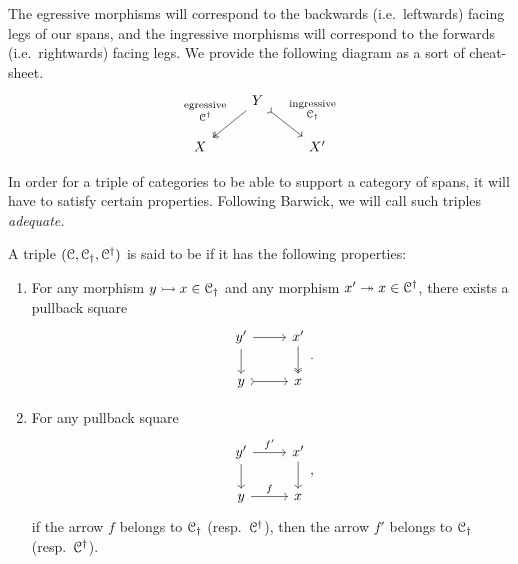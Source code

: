 \documentclass[main.tex]{subfiles}
\begin{document}
The egressive morphisms will correspond to the backwards (i.e.\ leftwards) facing legs of our spans, and the ingressive morphisms will correspond to the forwards (i.e.\ rightwards) facing legs. We provide the following diagram as a sort of cheat-sheet.
\begin{equation*}
  \begin{tikzcd}
    & Y
    \arrow[dl, two heads, swap, "\substack{\text{egressive} \\ \category{C}\updag}"]
    \arrow[dr, rightarrowtail, "\substack{\text{ingressive} \\ \category{C}\downdag}"]
    \\
    X
    && X'
  \end{tikzcd}
\end{equation*}

In order for a triple of categories to be able to support a category of spans, it will have to satisfy certain properties. Following Barwick, we will call such triples \emph{adequate.}

\begin{definition}
  \label{def:adequate_triple}
  A triple $(\mathcal{C}, \mathcal{C}_{\dagger}, \mathcal{C}^{\dagger})$ is said to be  if it has the following properties:
  \begin{enumerate}
    \item For any morphism $y \rightarrowtail x \in \mathcal{C}_{\dagger}$ and any morphism $x' \twoheadrightarrow x \in \mathcal{C}^{\dagger}$, there exists a pullback square
      \begin{equation*}
        \begin{tikzcd}
          y'
          \arrow[r]
          \arrow[d]
          & x'
          \arrow[d, two heads]
          \\
          y
          \arrow[r, rightarrowtail]
          & x
        \end{tikzcd}.
      \end{equation*}

    \item For any pullback square
      \begin{equation*}
        \begin{tikzcd}
          y'
          \arrow[r, "f'"]
          \arrow[d]
          & x'
          \arrow[d]
          \\
          y
          \arrow[r, "f"]
          & x
        \end{tikzcd},
      \end{equation*}
      if the arrow $f$ belongs to $\mathcal{C}_{\dagger}$ (resp.\ $\mathcal{C}^{\dagger}$), then the arrow $f'$ belongs to $\mathcal{C}_{\dagger}$ (resp.\ $\mathcal{C}^{\dagger}$).
  \end{enumerate}
\end{definition}
\end{document}
